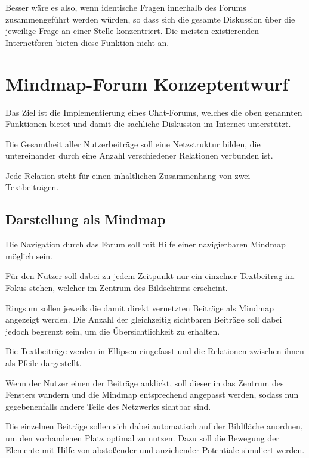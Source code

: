 \documentclass{article}
\begin{document}
	\bigskip
	Besser wäre es also, wenn identische Fragen innerhalb des Forums zusammengeführt werden würden, so dass sich die gesamte Diskussion über die jeweilige Frage an einer Stelle konzentriert. Die meisten existierenden Internetforen bieten diese Funktion nicht an.
		
	\section{Mindmap-Forum Konzeptentwurf}
	
	Das Ziel ist die Implementierung eines Chat-Forums, welches die oben genannten Funktionen bietet und damit die sachliche Diskussion im Internet unterstützt. 
	
	\bigskip
	Die Gesamtheit aller Nutzerbeiträge soll eine Netzstruktur bilden, die untereinander durch eine Anzahl verschiedener Relationen verbunden ist.
	
	\bigskip
	Jede Relation steht für einen inhaltlichen Zusammenhang von zwei Textbeiträgen.
	
	\subsection{Darstellung als Mindmap}
	
	Die Navigation durch das Forum soll mit Hilfe einer navigierbaren Mindmap möglich sein.
	
	\bigskip
	Für den Nutzer soll dabei zu jedem Zeitpunkt nur ein einzelner Textbeitrag im Fokus stehen, welcher im Zentrum des Bildschirms erscheint.
	
	\bigskip
	Ringsum sollen jeweils die damit direkt vernetzten Beiträge als Mindmap angezeigt werden. Die Anzahl der gleichzeitig sichtbaren Beiträge soll dabei jedoch begrenzt sein, um die Übersichtlichkeit zu erhalten.
	
	\bigskip
	Die Textbeiträge werden in Ellipsen eingefasst und die Relationen zwischen ihnen als Pfeile dargestellt.
	
	\bigskip
	Wenn der Nutzer einen der Beiträge anklickt, soll dieser in das Zentrum des Fensters wandern und die Mindmap entsprechend angepasst werden, sodass nun gegebenenfalls andere Teile des Netzwerks sichtbar sind.
	
	\bigskip
	Die einzelnen Beiträge sollen sich dabei automatisch auf der Bildfläche anordnen, um den vorhandenen Platz optimal zu nutzen. Dazu soll die Bewegung der Elemente mit Hilfe von abstoßender und anziehender Potentiale simuliert werden.
	
\end{document}

